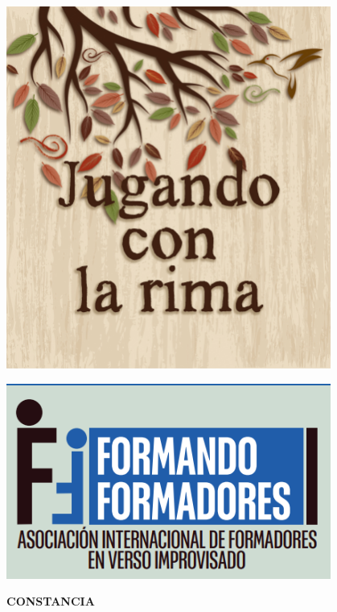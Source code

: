 \documentclass[landscape,letterpaper]{article}
\begin{document}
\noindent
\begin{minipage}[c]{0.2\textwidth}
    \includegraphics[width=0.8\textwidth]{jugando.jpg} %
\end{minipage}%
\hfill
\begin{minipage}[c]{0.3\textwidth}
    \hfill \includegraphics[width=0.8\textwidth]{asociacion.png} %
\end{minipage}

\vspace{1cm}

\begin{center}
    {\Large \textbf{CONSTANCIA}}
\end{center}

\vspace{0.5cm}
\end{document}
